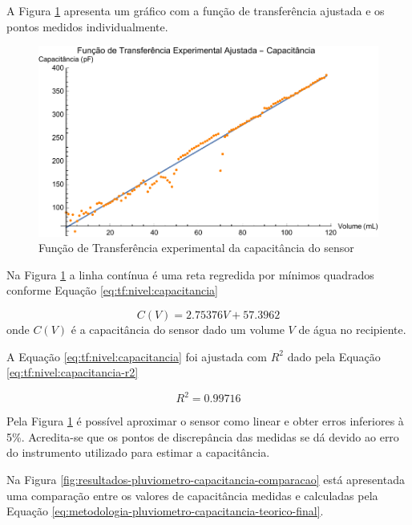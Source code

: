 \documentclass[a4paper]{instrumentacao}
\begin{document}
A Figura \ref{fig:tf:nivel:capacitancia} apresenta um gráfico com a função de transferência ajustada e os pontos medidos individualmente.

\begin{figure}[H]
	\centering \includegraphics[width=\textwidth]{Nivel/Experimental/Capacitancia-Ajuste.pdf}
	\caption{Função de Transferência experimental da capacitância do sensor}
	\label{fig:tf:nivel:capacitancia}
\end{figure}

Na Figura \ref{fig:tf:nivel:capacitancia} a linha contínua é uma reta regredida por mínimos quadrados conforme Equação \ref{eq:tf:nivel:capacitancia}

\begin{equation}
	C(V) = 2.75376 V+57.3962
	\label{eq:tf:nivel:capacitancia}
\end{equation}
\noindent onde $C(V)$ é a capacitância do sensor dado um volume $V$ de água no recipiente.

A Equação \ref{eq:tf:nivel:capacitancia} foi ajustada com $R^2$ dado pela Equação \ref{eq:tf:nivel:capacitancia-r2} 

\begin{equation}
	R^2 = 0.99716
	\label{eq:tf:nivel:capacitancia-r2}
\end{equation}

Pela Figura \ref{fig:tf:nivel:capacitancia} é possível aproximar o sensor como linear e obter erros inferiores à 5\%. Acredita-se que os pontos de discrepância das medidas se dá devido ao erro do instrumento utilizado para estimar a capacitância.

Na Figura \ref{fig:resultados-pluviometro-capacitancia-comparacao} está apresentada uma comparação entre os valores de capacitância medidas e calculadas pela Equação \ref{eq:metodologia-pluviometro-capacitancia-teorico-final}.
\end{document}
